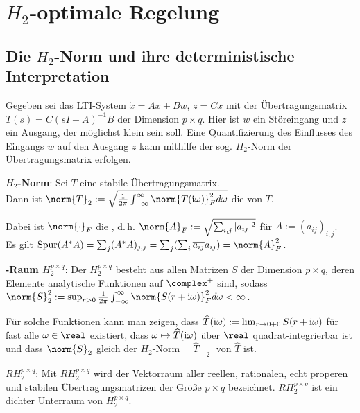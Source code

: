\chapter{%
    \texorpdfstring{$H_2$-optimale}{H₂-optimale} Regelung%
}

\section{%
    Die \texorpdfstring{$H_2$-Norm}{H₂-Norm} und ihre deterministische Interpretation%
}

Gegeben sei das LTI-System $\dot{x} = Ax + Bw$, $z = Cx$ mit
der Übertragungsmatrix\\
$T(s) = C(sI - A)^{-1}B$ der Dimension $p \times q$.
Hier ist $w$ ein Störeingang und $z$ ein Ausgang, der möglichst klein sein soll.
Eine Quantifizierung des Einflusses des Eingangs $w$ auf den Ausgang $z$ kann mithilfe der sog.
$H_2$-Norm der Übertragungsmatrix erfolgen.

\textbf{$H_2$-Norm}:
Sei $T$ eine stabile Übertragungsmatrix.\\
Dann ist
$\norm{T}_2 := \sqrt{\frac{1}{2\pi} \int_{-\infty}^\infty \norm{T(\iu\omega)}_F^2 d\omega}$
die  von $T$.

Dabei ist $\norm{\cdot}_F$ die , d.\,h.
$\norm{A}_F := \sqrt{\sum_{i,j} |a_{ij}|^2}$ für $A := (a_{ij})_{i,j}$.\\
Es gilt $\Spur(A^\ast A)
= \sum_j (A^\ast A)_{j,j}
= \sum_j (\sum_i \overline{a_{ij}} a_{ij})
= \norm{A}_F^2$.

\linie

\textbf{-Raum $H_2^{p \times q}$}:
Der  $H_2^{p \times q}$ besteht aus
allen Matrizen $S$ der Dimension $p \times q$,
deren Elemente analytische Funktionen auf $\complex^+$ sind, sodass\\
$\norm{S}_2^2 := \sup_{r > 0} \frac{1}{2\pi} \int_{-\infty}^\infty \norm{S(r + \iu\omega)}_F^2
d\omega < \infty$.

Für solche Funktionen kann man zeigen, dass
$\widehat{T}(\text{i}\omega) := \lim_{r \to 0+0} S(r + \text{i}\omega)$
für fast alle $\omega \in \real$ existiert,
dass $\omega \mapsto \widehat{T}(\text{i}\omega)$ über $\real$ quadrat-integrierbar ist und
dass $\norm{S}_2$ gleich der $H_2$-Norm $\lVert\widehat{T}\rVert_2$ von $\widehat{T}$ ist.

\textbf{$RH_2^{p \times q}$}:
Mit $RH_2^{p \times q}$ wird der Vektorraum aller reellen, rationalen, echt properen und stabilen
Übertragungsmatrizen der Größe $p \times q$ bezeichnet.
$RH_2^{p \times q}$ ist ein dichter Unterraum von $H_2^{p \times q}$.

